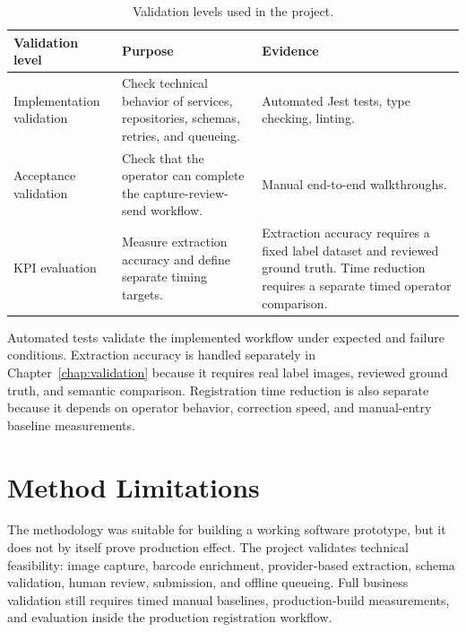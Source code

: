 \begin{table}[H]
\centering
\begin{tabularx}{\textwidth}{P{0.23\textwidth}YY}
\toprule
\textbf{Validation level} & \textbf{Purpose} & \textbf{Evidence} \\
\midrule
Implementation validation & Check technical behavior of services, repositories, schemas, retries, and queueing. & Automated Jest tests, type checking, linting. \\
Acceptance validation & Check that the operator can complete the capture-review-send workflow. & Manual end-to-end walkthroughs. \\
KPI evaluation & Measure extraction accuracy and define separate timing targets. & Extraction accuracy requires a fixed label dataset and reviewed ground truth. Time reduction requires a separate timed operator comparison. \\
\bottomrule
\end{tabularx}
\caption{Validation levels used in the project.}
\label{tab:validation-levels}
\end{table}

Automated tests validate the implemented workflow under expected and failure conditions. Extraction accuracy is handled separately in Chapter~\ref{chap:validation} because it requires real label images, reviewed ground truth, and semantic comparison. Registration time reduction is also separate because it depends on operator behavior, correction speed, and manual-entry baseline measurements.

\section{Method Limitations}

The methodology was suitable for building a working software prototype, but it does not by itself prove production effect. The project validates technical feasibility: image capture, barcode enrichment, provider-based extraction, schema validation, human review, submission, and offline queueing. Full business validation still requires timed manual baselines, production-build measurements, and evaluation inside the production registration workflow.
